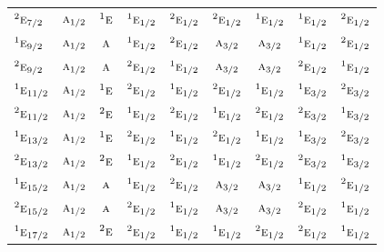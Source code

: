 \documentclass[10pt,a4paper]{article}
\numberwithin{equation}{section}
\newcommand{\irr}[1]{\text{\normalfont\scshape #1}}
\newcommand{\conjpair}[1]{{}^{#1}}
\begin{document}
{\begin{longtable}{@{}lcccccccc@{}}
$\conjpair{2}\irr{e}_{7/2}$ & $\irr{a}_{1/2}$ & $\conjpair{1}\irr{e}$ & $\conjpair{1}\irr{e}_{1/2}$ & $\conjpair{2}\irr{e}_{1/2}$ & $\conjpair{2}\irr{e}_{1/2}$ & $\conjpair{1}\irr{e}_{1/2}$ & $\conjpair{1}\irr{e}_{1/2}$ & $\conjpair{2}\irr{e}_{1/2}$\\
$\conjpair{1}\irr{e}_{9/2}$ & $\irr{a}_{1/2}$ & $\irr{a}$ & $\conjpair{1}\irr{e}_{1/2}$ & $\conjpair{2}\irr{e}_{1/2}$ & $\irr{a}_{3/2}$ & $\irr{a}_{3/2}$ & $\conjpair{1}\irr{e}_{1/2}$ & $\conjpair{2}\irr{e}_{1/2}$\\
$\conjpair{2}\irr{e}_{9/2}$ & $\irr{a}_{1/2}$ & $\irr{a}$ & $\conjpair{2}\irr{e}_{1/2}$ & $\conjpair{1}\irr{e}_{1/2}$ & $\irr{a}_{3/2}$ & $\irr{a}_{3/2}$ & $\conjpair{2}\irr{e}_{1/2}$ & $\conjpair{1}\irr{e}_{1/2}$\\
$\conjpair{1}\irr{e}_{11/2}$ & $\irr{a}_{1/2}$ & $\conjpair{1}\irr{e}$ & $\conjpair{2}\irr{e}_{1/2}$ & $\conjpair{1}\irr{e}_{1/2}$ & $\conjpair{2}\irr{e}_{1/2}$ & $\conjpair{1}\irr{e}_{1/2}$ & $\conjpair{1}\irr{e}_{3/2}$ & $\conjpair{2}\irr{e}_{3/2}$\\
$\conjpair{2}\irr{e}_{11/2}$ & $\irr{a}_{1/2}$ & $\conjpair{2}\irr{e}$ & $\conjpair{1}\irr{e}_{1/2}$ & $\conjpair{2}\irr{e}_{1/2}$ & $\conjpair{1}\irr{e}_{1/2}$ & $\conjpair{2}\irr{e}_{1/2}$ & $\conjpair{2}\irr{e}_{3/2}$ & $\conjpair{1}\irr{e}_{3/2}$\\
$\conjpair{1}\irr{e}_{13/2}$ & $\irr{a}_{1/2}$ & $\conjpair{1}\irr{e}$ & $\conjpair{2}\irr{e}_{1/2}$ & $\conjpair{1}\irr{e}_{1/2}$ & $\conjpair{2}\irr{e}_{1/2}$ & $\conjpair{1}\irr{e}_{1/2}$ & $\conjpair{1}\irr{e}_{3/2}$ & $\conjpair{2}\irr{e}_{3/2}$\\
$\conjpair{2}\irr{e}_{13/2}$ & $\irr{a}_{1/2}$ & $\conjpair{2}\irr{e}$ & $\conjpair{1}\irr{e}_{1/2}$ & $\conjpair{2}\irr{e}_{1/2}$ & $\conjpair{1}\irr{e}_{1/2}$ & $\conjpair{2}\irr{e}_{1/2}$ & $\conjpair{2}\irr{e}_{3/2}$ & $\conjpair{1}\irr{e}_{3/2}$\\
$\conjpair{1}\irr{e}_{15/2}$ & $\irr{a}_{1/2}$ & $\irr{a}$ & $\conjpair{1}\irr{e}_{1/2}$ & $\conjpair{2}\irr{e}_{1/2}$ & $\irr{a}_{3/2}$ & $\irr{a}_{3/2}$ & $\conjpair{1}\irr{e}_{1/2}$ & $\conjpair{2}\irr{e}_{1/2}$\\
$\conjpair{2}\irr{e}_{15/2}$ & $\irr{a}_{1/2}$ & $\irr{a}$ & $\conjpair{2}\irr{e}_{1/2}$ & $\conjpair{1}\irr{e}_{1/2}$ & $\irr{a}_{3/2}$ & $\irr{a}_{3/2}$ & $\conjpair{2}\irr{e}_{1/2}$ & $\conjpair{1}\irr{e}_{1/2}$\\
$\conjpair{1}\irr{e}_{17/2}$ & $\irr{a}_{1/2}$ & $\conjpair{2}\irr{e}$ & $\conjpair{2}\irr{e}_{1/2}$ & $\conjpair{1}\irr{e}_{1/2}$ & $\conjpair{1}\irr{e}_{1/2}$ & $\conjpair{2}\irr{e}_{1/2}$ & $\conjpair{2}\irr{e}_{1/2}$ & $\conjpair{1}\irr{e}_{1/2}$\\

\end{longtable}}
\end{document}

